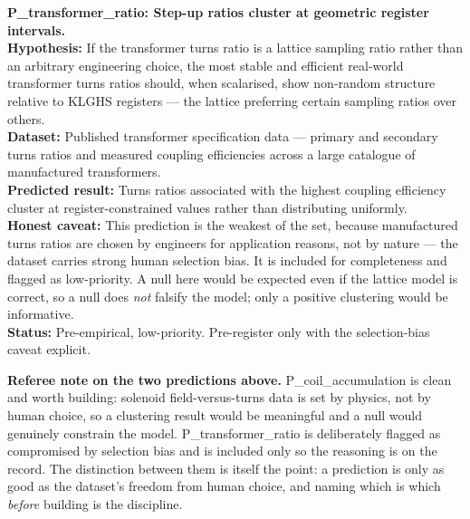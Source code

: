 \documentclass[11pt, letterpaper, openany]{book}
\begin{document}
\begin{predictionbox}
\textbf{P\_transformer\_ratio: Step-up ratios cluster at geometric
register intervals.}\\[0.5em]
\textbf{Hypothesis:} If the transformer turns ratio is a lattice sampling
ratio rather than an arbitrary engineering choice, the most stable and
efficient real-world transformer turns ratios should, when scalarised,
show non-random structure relative to KLGHS registers --- the lattice
preferring certain sampling ratios over others.\\[0.5em]
\textbf{Dataset:} Published transformer specification data --- primary and
secondary turns ratios and measured coupling efficiencies across a large
catalogue of manufactured transformers.\\[0.5em]
\textbf{Predicted result:} Turns ratios associated with the highest
coupling efficiency cluster at register-constrained values rather than
distributing uniformly.\\[0.5em]
\textbf{Honest caveat:} This prediction is the weakest of the set, because
manufactured turns ratios are chosen by engineers for application reasons,
not by nature --- the dataset carries strong human selection bias. It is
included for completeness and flagged as low-priority. A null here would be
expected even if the lattice model is correct, so a null does \emph{not}
falsify the model; only a positive clustering would be informative.\\[0.5em]
\textbf{Status:} Pre-empirical, low-priority. Pre-register only with the
selection-bias caveat explicit.
\end{predictionbox}
 
\begin{warningbox}
\textbf{Referee note on the two predictions above.} P\_coil\_accumulation
is clean and worth building: solenoid field-versus-turns data is set by
physics, not by human choice, so a clustering result would be meaningful
and a null would genuinely constrain the model. P\_transformer\_ratio is
deliberately flagged as compromised by selection bias and is included only
so the reasoning is on the record. The distinction between them is itself
the point: a prediction is only as good as the dataset's freedom from human
choice, and naming which is which \emph{before} building is the discipline.
\end{warningbox}
 
\clearpage
 
\end{document}
